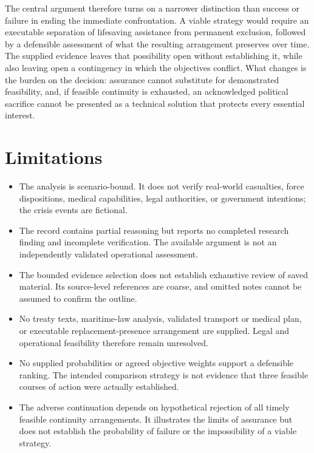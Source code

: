 \documentclass[11pt]{article}
\begin{document}
The central argument therefore turns on a narrower distinction than success or failure in ending the immediate confrontation. A viable strategy would require an executable separation of lifesaving assistance from permanent exclusion, followed by a defensible assessment of what the resulting arrangement preserves over time. The supplied evidence leaves that possibility open without establishing it, while also leaving open a contingency in which the objectives conflict. What changes is the burden on the decision: assurance cannot substitute for demonstrated feasibility, and, if feasible continuity is exhausted, an acknowledged political sacrifice cannot be presented as a technical solution that protects every essential interest.

\section{Limitations}
\begin{itemize}
\item The analysis is scenario-bound. It does not verify real-world casualties, force dispositions, medical capabilities, legal authorities, or government intentions; the crisis events are fictional.
\item The record contains partial reasoning but reports no completed research finding and incomplete verification. The available argument is not an independently validated operational assessment.
\item The bounded evidence selection does not establish exhaustive review of saved material. Its source-level references are coarse, and omitted notes cannot be assumed to confirm the outline.
\item No treaty texts, maritime-law analysis, validated transport or medical plan, or executable replacement-presence arrangement are supplied. Legal and operational feasibility therefore remain unresolved.
\item No supplied probabilities or agreed objective weights support a defensible ranking. The intended comparison strategy is not evidence that three feasible courses of action were actually established.
\item The adverse continuation depends on hypothetical rejection of all timely feasible continuity arrangements. It illustrates the limits of assurance but does not establish the probability of failure or the impossibility of a viable strategy.
\end{itemize}
\end{document}
